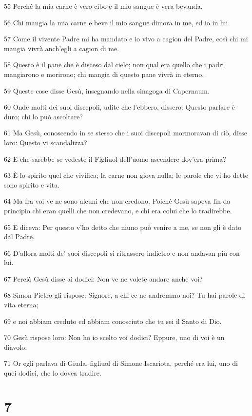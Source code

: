 \par 55 Perché la mia carne è vero cibo e il mio sangue è vera bevanda.
\par 56 Chi mangia la mia carne e beve il mio sangue dimora in me, ed io in lui.
\par 57 Come il vivente Padre mi ha mandato e io vivo a cagion del Padre, così chi mi mangia vivrà anch'egli a cagion di me.
\par 58 Questo è il pane che è disceso dal cielo; non qual era quello che i padri mangiarono e morirono; chi mangia di questo pane vivrà in eterno.
\par 59 Queste cose disse Gesù, insegnando nella sinagoga di Capernaum.
\par 60 Onde molti dei suoi discepoli, udite che l'ebbero, dissero: Questo parlare è duro; chi lo può ascoltare?
\par 61 Ma Gesù, conoscendo in se stesso che i suoi discepoli mormoravan di ciò, disse loro: Questo vi scandalizza?
\par 62 E che sarebbe se vedeste il Figliuol dell'uomo ascendere dov'era prima?
\par 63 È lo spirito quel che vivifica; la carne non giova nulla; le parole che vi ho dette sono spirito e vita.
\par 64 Ma fra voi ve ne sono alcuni che non credono. Poiché Gesù sapeva fin da principio chi eran quelli che non credevano, e chi era colui che lo tradirebbe.
\par 65 E diceva: Per questo v'ho detto che niuno può venire a me, se non gli è dato dal Padre.
\par 66 D'allora molti de' suoi discepoli si ritrassero indietro e non andavan più con lui.
\par 67 Perciò Gesù disse ai dodici: Non ve ne volete andare anche voi?
\par 68 Simon Pietro gli rispose: Signore, a chi ce ne andremmo noi? Tu hai parole di vita eterna;
\par 69 e noi abbiam creduto ed abbiam conosciuto che tu sei il Santo di Dio.
\par 70 Gesù rispose loro: Non ho io scelto voi dodici? Eppure, uno di voi è un diavolo.
\par 71 Or egli parlava di Giuda, figliuol di Simone Iscariota, perché era lui, uno di quei dodici, che lo dovea tradire.

\chapter{7}

